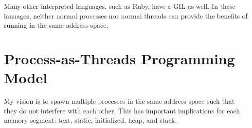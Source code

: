\documentclass[letterpaper,twocolumn,10pt]{article}
\begin{document}
Many other interpreted-languages, such as Ruby, have a GIL as well.
In these lanuages, neither normal processes nor normal threads can provide the benefits of running in the same address-space.

\section{Process-as-Threads Programming Model}

My vision is to spawn multiple processes in the same address-space such that they do not interfere with each other.
This has important implications for each memory segment: text, static, initialized, heap, and stack.
\end{document}
